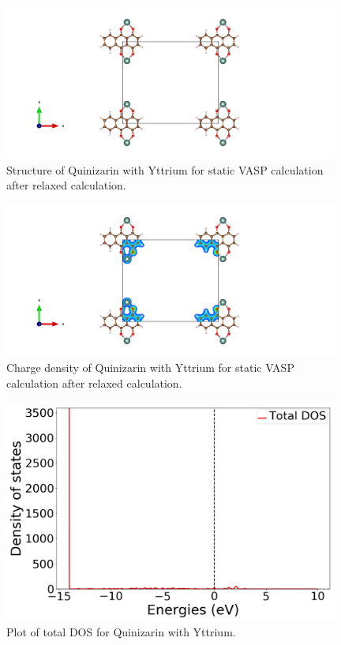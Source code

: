 \documentclass{article}
\begin{document}
  \begin{figure}[H]
      \centering
      \includegraphics[width = 11cm]{../fig/Y_staticafter_CONTCAR.png}
      \caption{Structure of Quinizarin with Yttrium for static VASP calculation after relaxed calculation. }
      \label{fig:Y_staticafter_CONTCAR}
  \end{figure}

  \begin{figure}[H]
      \centering
      \includegraphics[width = 11cm]{../fig/Y_staticafter_CHGCAR.png}
      \caption{Charge density of Quinizarin with Yttrium for static VASP calculation after relaxed calculation. }
      \label{fig:Y_staticafter_CHGCAR}
  \end{figure}

  \begin{figure}[H]
      \centering
      \includegraphics[width = 11cm]{../fig/Y_TDOS_1.png}
      \caption{Plot of total DOS for Quinizarin with Yttrium. }
      \label{fig:Y_TDOS_1.png}
  \end{figure}
\end{document}
